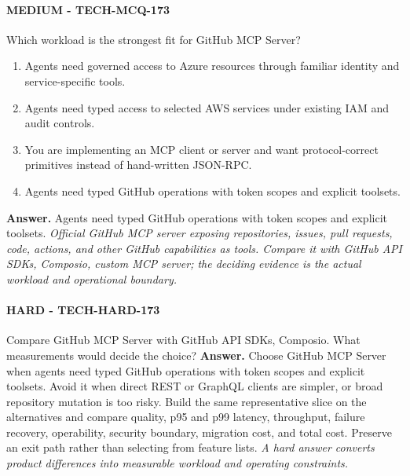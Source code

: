 \paragraph{MEDIUM - TECH-MCQ-173} Which workload is the strongest fit for GitHub MCP Server?
\begin{enumerate}[label=\Alph*.]
\item Agents need governed access to Azure resources through familiar identity and service-specific tools.
\item Agents need typed access to selected AWS services under existing IAM and audit controls.
\item You are implementing an MCP client or server and want protocol-correct primitives instead of hand-written JSON-RPC.
\item Agents need typed GitHub operations with token scopes and explicit toolsets.
\end{enumerate}
\textbf{Answer.} Agents need typed GitHub operations with token scopes and explicit toolsets.
\textit{Official GitHub MCP server exposing repositories, issues, pull requests, code, actions, and other GitHub capabilities as tools. Compare it with GitHub API SDKs, Composio, custom MCP server; the deciding evidence is the actual workload and operational boundary.}
\paragraph{HARD - TECH-HARD-173} Compare GitHub MCP Server with GitHub API SDKs, Composio. What measurements would decide the choice?
\textbf{Answer.} Choose GitHub MCP Server when agents need typed GitHub operations with token scopes and explicit toolsets. Avoid it when direct REST or GraphQL clients are simpler, or broad repository mutation is too risky. Build the same representative slice on the alternatives and compare quality, p95 and p99 latency, throughput, failure recovery, operability, security boundary, migration cost, and total cost. Preserve an exit path rather than selecting from feature lists.
\textit{A hard answer converts product differences into measurable workload and operating constraints.}
